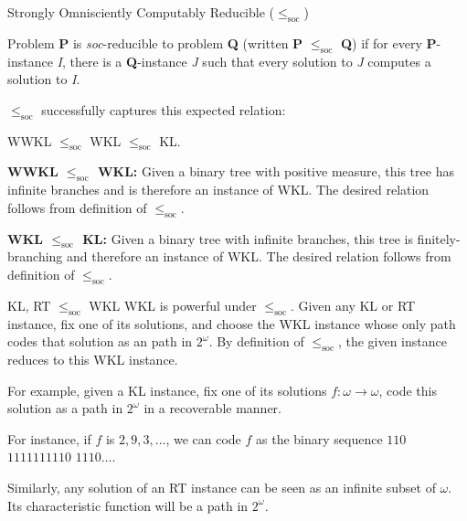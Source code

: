 \begin{frame}{Strongly Omnisciently Computably Reducible
($\leq_{\text{soc}}$)}
  \begin{define*}
    Problem \textbf{P} is \textit{soc}-reducible to problem \textbf{Q}
    (written \textbf{P} $\leq_{\text{soc}}$ \textbf{Q}) if for every
    \textbf{P}-instance \textit{I}, there is a \textbf{Q}-instance
    \textit{J} such that every solution to \textit{J} computes a solution
    to \textit{I}.
  \end{define*}

  $\leq_{\text{soc}}$ successfully captures this expected relation:
  \begin{center}
    WWKL $\leq_{\text{soc}}$ WKL $\leq_{\text{soc}}$ KL.
  \end{center}

  \vspace{0.5em}
  \textbf{WWKL $\leq_{\text{soc}}$ WKL:} Given a binary tree with
  positive measure, this tree has infinite branches and is therefore an
  instance of WKL. The desired relation follows from definition of
  $\leq_{\text{soc}}$.

  \vspace{0.5em}
  \textbf{WKL $\leq_{\text{soc}}$ KL:} Given a binary tree with infinite
  branches, this tree is finitely-branching and therefore an instance of
  WKL. The desired relation follows from definition of $\leq_{\text{soc}}$.
\end{frame}

\begin{frame}{KL, RT $\leq_{\text{soc}}$ WKL}
  WKL is powerful under $\leq_{\text{soc}}$. Given any KL or RT
  instance, fix one of its solutions, and choose the WKL instance whose only
  path codes that solution as an path in $2^\omega$. By definition of
  $\leq_{\text{soc}}$, the given instance reduces to this WKL instance.

  \vspace{1em}
  For example, given a KL instance, fix one of its solutions
  $f:\omega\rightarrow\omega$, code this solution as a path in $2^\omega$
  in a recoverable manner.

  \vspace{1em}
  For instance, if $f$ is $2,9,3,\ldots$, we can code $f$ as the binary
  sequence $110$ $1111111110$ $1110\ldots$.

  \vspace{1em}
  Similarly, any solution of an RT instance can be seen as an infinite
  subset of $\omega$. Its characteristic function will be a path in
  $2^\omega$.
\end{frame}

